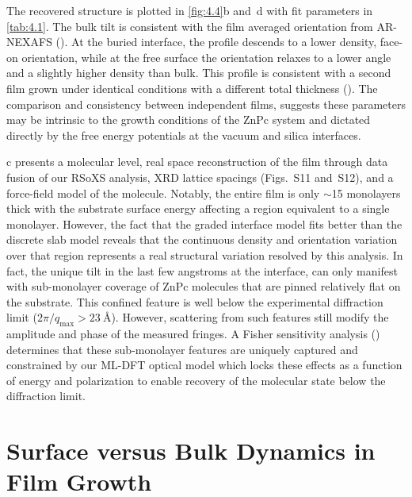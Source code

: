 The recovered structure is plotted in \cref{fig:4.4}b and~d with fit parameters in \cref{tab:4.1}. The bulk tilt is consistent with the film averaged orientation from AR-NEXAFS (). At the buried interface, the profile descends to a lower density, face-on orientation, while at the free surface the orientation relaxes to a lower angle and a slightly higher density than bulk. This profile is consistent with a second film grown under identical conditions with a different total thickness (). The comparison and consistency between independent films, suggests these parameters may be intrinsic to the growth conditions of the ZnPc system and dictated directly by the free energy potentials at the vacuum and silica interfaces.

c presents a molecular level, real space reconstruction of the film through data fusion of our RSoXS analysis, XRD lattice spacings (Figs.~S11 and~S12), and a force-field model of the molecule. Notably, the entire film is only \({\sim}\)15 monolayers thick with the substrate surface energy affecting a region equivalent to a single monolayer. However, the fact that the graded interface model fits better than the discrete slab model reveals that the continuous density and orientation variation over that region represents a real structural variation resolved by this analysis. In fact, the unique tilt in the last few angstroms at the interface, can only manifest with sub-monolayer coverage of ZnPc molecules that are pinned relatively flat on the substrate. This confined feature is well below the experimental diffraction limit (\(2\pi/q_{\max} > \qty{23}{\angstrom}\)). However, scattering from such features still modify the amplitude and phase of the measured fringes. A Fisher sensitivity analysis () determines that these sub-monolayer features are uniquely captured and constrained by our ML-DFT optical model which locks these effects as a function of energy and polarization to enable recovery of the molecular state below the diffraction limit.

\section{Surface versus Bulk Dynamics in Film Growth}\label{sec:surface-vs-bulk-dynamics-in-film-growth}

